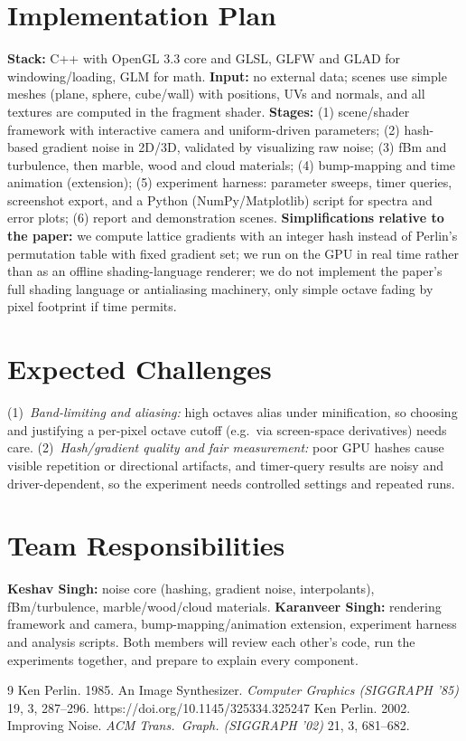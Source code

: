 \documentclass[acmlarge,nonacm]{acmart}
\begin{document}
\section{Implementation Plan}\label{sec:plan}
\textbf{Stack:} C++ with OpenGL 3.3 core and GLSL, GLFW and GLAD for windowing/loading, GLM for math. \textbf{Input:} no external data; scenes use simple meshes (plane, sphere, cube/wall) with positions, UVs and normals, and all textures are computed in the fragment shader.
\textbf{Stages:}
(1) scene/shader framework with interactive camera and uniform-driven parameters;
(2) hash-based gradient noise in 2D/3D, validated by visualizing raw noise;
(3) fBm and turbulence, then marble, wood and cloud materials;
(4) bump-mapping and time animation (extension);
(5) experiment harness: parameter sweeps, timer queries, screenshot export, and a Python (NumPy/Matplotlib) script for spectra and error plots;
(6) report and demonstration scenes.
\textbf{Simplifications relative to the paper:} we compute lattice gradients with an integer hash instead of Perlin's permutation table with fixed gradient set; we run on the GPU in real time rather than as an offline shading-language renderer; we do not implement the paper's full shading language or antialiasing machinery, only simple octave fading by pixel footprint if time permits.

\section{Expected Challenges}\label{sec:challenges}
(1)~\emph{Band-limiting and aliasing:} high octaves alias under minification, so choosing and justifying a per-pixel octave cutoff (e.g.\ via screen-space derivatives) needs care. (2)~\emph{Hash/gradient quality and fair measurement:} poor GPU hashes cause visible repetition or directional artifacts, and timer-query results are noisy and driver-dependent, so the experiment needs controlled settings and repeated runs.

\section{Team Responsibilities}\label{sec:team}
\textbf{Keshav Singh:} noise core (hashing, gradient noise, interpolants), fBm/turbulence, marble/wood/cloud materials. \textbf{Karanveer Singh:} rendering framework and camera, bump-mapping/animation extension, experiment harness and analysis scripts. Both members will review each other's code, run the experiments together, and prepare to explain every component.

\begin{thebibliography}{9}
 Ken Perlin. 1985. An Image Synthesizer. \emph{Computer Graphics (SIGGRAPH '85)} 19, 3, 287--296. https://doi.org/10.1145/325334.325247
 Ken Perlin. 2002. Improving Noise. \emph{ACM Trans.\ Graph. (SIGGRAPH '02)} 21, 3, 681--682.
\end{thebibliography}
\end{document}
